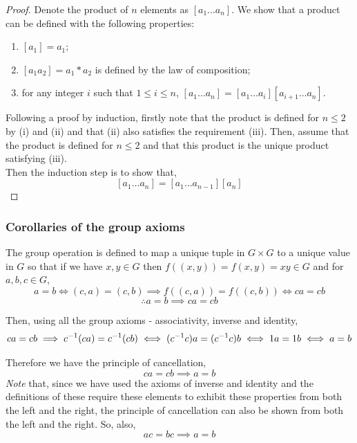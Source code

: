 \documentclass[MathsNotesBase.tex]{subfiles}
\begin{document}
{	
	\begin{proof}
		Denote the product of $n$ elements as ${ [a_1 \dots a_n] }$. We show that a product can be defined with the following properties:
		\begin{enumerate}[label=(\roman*)]
			\item{${ [a_1] = a_1 }$;}
			\item{${ [a_1a_2] = a_1 * a_2 }$ is defined by the law of composition;}
			\item{for any integer $i$ such that ${ 1 \leq i \leq n }$, ${ [a_1\dots a_n] = [a_1\dots a_i][a_{i+1}\dots a_n] }$.}
		\end{enumerate}
		Following a proof by induction, firstly note that the product is defined for ${ n \leq 2 }$ by (i) and (ii) and that (ii) also satisfies the requirement (iii). Then, assume that the product is defined for ${ n \leq 2 }$ and that this product is the unique product satisfying (iii).\\
		Then the induction step is to show that,
		\[ [a_1\dots a_n] = [a_1\dots a_{n-1}][a_n] \]
	\end{proof}
	
	\bigskip\bigskip
	\subsubsection{Corollaries of the group axioms}
	The group operation is defined to map a unique tuple in $G \times G$ to a unique value in $G$ so that if we have $x,y \in G$ then $f((x, y)) = f(x,y) = xy \in G$ and for $a,b,c \in G$,
	\[ a = b \iff (c, a) = (c, b) \implies f((c, a)) = f((c, b)) \iff ca = cb \]
	\[ \therefore a = b \implies ca = cb \]
	
	Then, using all the group axioms - associativity, inverse and identity,
	\[ ca = cb \implies {c}^{-1}(ca) = {c}^{-1}(cb) \iff ({c}^{-1}c)a = ({c}^{-1}c)b \iff 1a = 1b \iff a = b \]
	
	Therefore we have the principle of cancellation,
	\[ ca = cb \implies a = b \]
	\textit{Note} that, since we have used the axioms of inverse and identity and the definitions of these require these elements to exhibit these properties from both the left and the right, the principle of cancellation can also be shown from both the left and the right. So, also,
	\[ ac = bc \implies a = b \]
	
}
\end{document}
